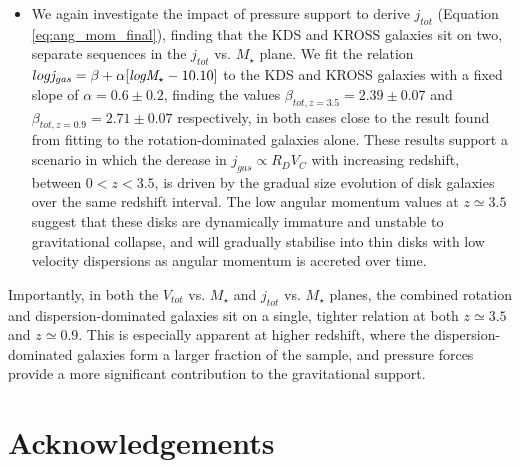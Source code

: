 \documentclass[fleqn,usenatbib]{mnras}
\begin{document}
\begin{itemize}
    \item We again investigate the impact of pressure support to derive $j_{tot}$ (Equation \ref{eq:ang_mom_final}), finding that the KDS and KROSS galaxies sit on two, separate sequences in the $j_{tot}$ vs. $M_{\star}$ plane. 
    We fit the relation $log{\it j_{gas}} =  \beta + \alpha[{\it logM_{\star}} - 10.10]$ to the KDS and KROSS galaxies with a fixed slope of $\alpha=0.6\pm0.2$, finding the values $\beta_{tot,z=3.5} = 2.39\pm0.07$ and $\beta_{tot,z=0.9} = 2.71\pm0.07$ respectively, in both cases close to the result found from fitting to the rotation-dominated galaxies alone.
    These results support a scenario in which the derease in $j_{gas} \propto R_{D}V_{C}$ with increasing redshift, between $0 < z < 3.5$, is driven by the gradual size evolution of disk galaxies over the same redshift interval.
    The low angular momentum values at $z\simeq3.5$ suggest that these disks are dynamically immature and unstable to gravitational collapse, and will gradually stabilise into thin disks with low velocity dispersions as angular momentum is accreted over time.

\end{itemize}

\noindent
Importantly, in both the $V_{tot}$ vs. $M_{\star}$ and $j_{tot}$ vs. $M_{\star}$ planes, the combined rotation and dispersion-dominated galaxies sit on a single, tighter relation at both $z\simeq3.5$ and $z\simeq0.9$.
This is especially apparent at higher redshift, where the dispersion-dominated galaxies form a larger fraction of the sample, and pressure forces provide a more significant contribution to the gravitational support.

\section*{Acknowledgements}
\end{document}
